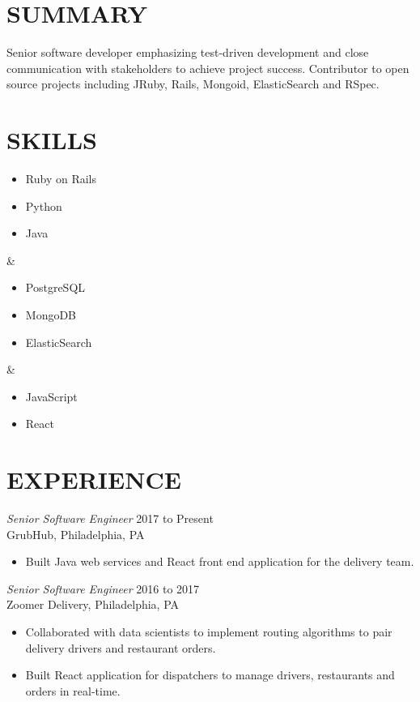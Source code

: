 \documentclass[line]{res}
\begin{document}
\newsectionwidth{0in}

\address{michaelcdalton@gmail.com / (267) 247-2541}
\address{github.com/kcdragon / linkedin.com/in/michaelcdalton}

\begin{resume}
\section{SUMMARY}
Senior software developer emphasizing test-driven development and close communication with stakeholders to achieve project success. Contributor to open source projects including JRuby, Rails, Mongoid, ElasticSearch and RSpec.

\section{SKILLS}
\begin{ncolumn}{3}
\begin{itemize} \itemsep -2pt
\item Ruby on Rails
\item Python
\item Java
\end{itemize}
&
\begin{itemize} \itemsep -2pt
\item PostgreSQL
\item MongoDB
\item ElasticSearch
\end{itemize}
&
\begin{itemize} \itemsep -2pt
\item JavaScript
\item React
\end{itemize}
\end{ncolumn}

\section{EXPERIENCE}

{\sl Senior Software Engineer} \hfill 2017 to Present \\
GrubHub, Philadelphia, PA
\begin{itemize} \itemsep -2pt
\item Built Java web services and React front end application for the delivery team.
\end{itemize}

{\sl Senior Software Engineer} \hfill 2016 to 2017 \\
Zoomer Delivery, Philadelphia, PA
\begin{itemize} \itemsep -2pt
\item Collaborated with data scientists to implement routing algorithms to pair delivery drivers and restaurant orders.
\item Built React application for dispatchers to manage drivers, restaurants and orders in real-time.
\end{itemize}


\end{resume}
\end{document}
